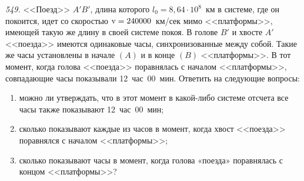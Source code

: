 \newpage
\emph{549.} <<Поезд>> \( A'B' \), длина которого \( l_0 = 8,64 \cdot 10^8 \)~км
в системе, где он покоится, идет со скоростью \( \mathrm{v} = 240 000 \)~км/сек мимо
<<платформы>>, имеющей такую же длину в своей системе покоя. В голове \( B' \) и
хвосте \( A' \) <<поезда>> имеются одинаковые часы, синхронизованные между
собой. Такие же часы установлены в начале \( (A) \) и в конце \( (B) \)
<<платформы>>. В тот момент, когда голова <<поезда>> поравнялась с началом
<<платформы>>, совпадающие часы показывали 12~час~00~мин. Ответить на
следующие вопросы:
\vspace*{-.9em}
\begin{enumerate} \itemsep-.5em
    \item можно ли утверждать, что в этот момент в какой-либо системе отсчета все
    часы также показывают 12~час~00~мин;
    \item сколько показывают каждые из часов в момент, когда хвост <<поезда>>
    поравнялся с началом <<платформы>>;
    \item сколько показывают часы в момент, когда голова «поезда» поравнялась
    с концом <<платформы>>?
\end{enumerate}

